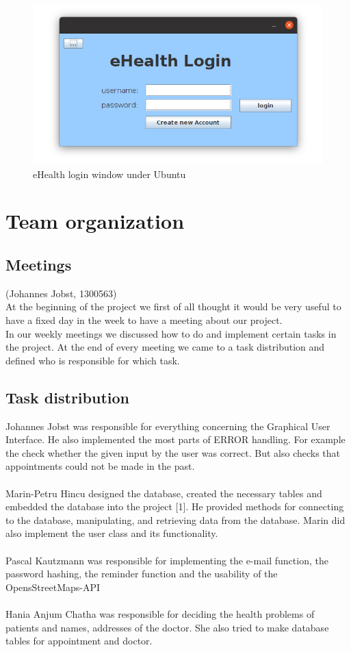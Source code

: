 \documentclass[a4paper, 12pt]{report}
\begin{document}
\begin{figure}[!h]
\includegraphics[width=\linewidth]{login.jpg} 
\caption{eHealth login window under Ubuntu}
\end{figure}

\chapter{Team organization}
\section{Meetings}
{\tiny (Johannes Jobst, 1300563)\\}
At the beginning of the project we first of all thought it would be very useful 
to have a fixed day in the week to have a meeting about our project. \\
In our weekly meetings we discussed how to do and implement certain tasks in the project.
At the end of every meeting we came to a task distribution and defined who is
responsible for which task. 

\section{Task distribution}
Johannes Jobst was responsible for everything concerning the Graphical User Interface.
He also implemented the most parts of ERROR handling. For example the check whether the given
input by the user was correct. But also checks that appointments could not be made in the past. \\ \\
Marin-Petru Hincu designed the database, created the necessary tables and embedded the database into the project [1]. He provided methods for connecting to the database, manipulating, and retrieving data from the database. Marin did also implement the user class and its functionality. \\ \\
Pascal Kautzmann was responsible for implementing the e-mail function, the password hashing, the reminder function and the usability of the OpensStreetMaps-API \\ 
	\\
Hania Anjum Chatha was responsible for deciding the health problems of patients and names, addresses of the doctor. She also tried to make database tables for appointment and doctor.
\end{document}
